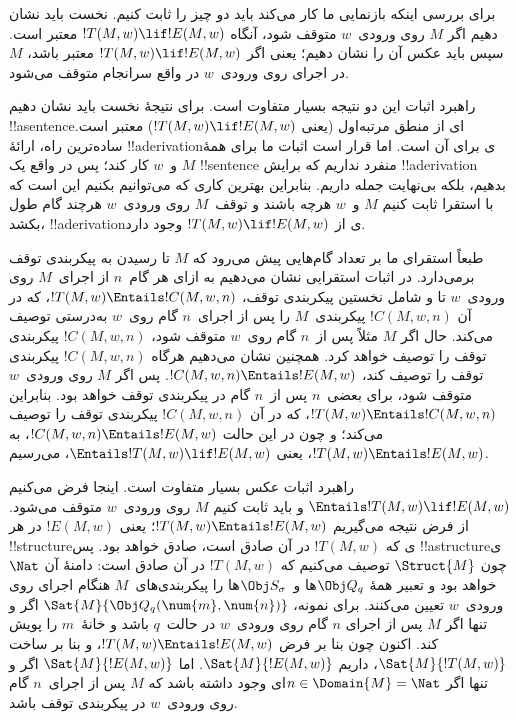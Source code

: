 \documentclass[../../../include/open-logic-section]{subfiles}
\begin{document}

\begin{explain}
برای بررسی اینکه بازنمایی ما کار می‌کند باید دو چیز را ثابت کنیم.
نخست باید نشان دهیم اگر $M$ روی ورودی~$w$ متوقف شود، آنگاه
$!T(M,w)\lif !E(M,w)$ معتبر است. سپس باید عکس آن را نشان دهیم؛ یعنی
اگر $!T(M,w)\lif !E(M,w)$ معتبر باشد، $M$ در اجرای روی ورودی~$w$ در
واقع سرانجام متوقف می‌شود.

راهبرد اثبات این دو نتیجه بسیار متفاوت است. برای نتیجهٔ نخست باید
نشان دهیم !!a{sentence}ای از منطق مرتبه‌اول (یعنی
$!T(M,w)\lif !E(M,w)$) معتبر است. ساده‌ترین راه، ارائهٔ !!a{derivation}ی
برای آن است. اما قرار است اثبات ما برای همهٔ $M$ و~$w$ کار کند؛ پس
در واقع یک !!{sentence}ٔ منفرد نداریم که برایش !!a{derivation} بدهیم، بلکه
بی‌نهایت جمله داریم. بنابراین بهترین کاری که می‌توانیم بکنیم این است
که با استقرا ثابت کنیم $M$ و~$w$ هرچه باشند و توقف~$M$ روی ورودی~$w$
هرچند گام طول بکشد، !!a{derivation}ی از $!T(M,w)\lif !E(M,w)$ وجود دارد.

طبعاً استقرای ما بر تعداد گام‌هایی پیش می‌رود که $M$ تا رسیدن به
پیکربندی توقف برمی‌دارد. در اثبات استقرایی نشان می‌دهیم به ازای هر
گام~$n$ از اجرای~$M$ روی ورودی~$w$ تا و شامل نخستین پیکربندی توقف،
$!T(M,w)\Entails !C(M,w,n)$، که در آن $!C(M,w,n)$ پیکربندی~$M$ را پس
از اجرای~$n$ گام روی~$w$ به‌درستی توصیف می‌کند. حال اگر $M$ مثلاً پس
از~$n$ گام روی~$w$ متوقف شود، $!C(M,w,n)$ پیکربندی توقف را توصیف
خواهد کرد. همچنین نشان می‌دهیم هرگاه $!C(M,w,n)$ پیکربندی توقف را
توصیف کند، $!C(M,w,n)\Entails !E(M,w)$. پس اگر $M$ روی ورودی~$w$
متوقف شود، برای بعضی~$n$ پس از~$n$ گام در پیکربندی توقف خواهد بود.
بنابراین $!T(M,w)\Entails !C(M,w,n)$، که در آن $!C(M,w,n)$ پیکربندی
توقف را توصیف می‌کند؛ و چون در این حالت
$!C(M,w,n)\Entails !E(M,w)$، به
$!T(M,w)\Entails !E(M,w)$، یعنی
$\Entails !T(M,w)\lif !E(M,w)$، می‌رسیم.

راهبرد اثبات عکس بسیار متفاوت است. اینجا فرض می‌کنیم
$\Entails !T(M,w)\lif !E(M,w)$ و باید ثابت کنیم $M$ روی ورودی~$w$
متوقف می‌شود. از فرض نتیجه می‌گیریم
$!T(M,w)\Entails !E(M,w)$؛ یعنی $!E(M,w)$ در هر !!{structure}ی که
$!T(M,w)$ در آن صادق است، صادق خواهد بود. پس !!a{structure}ی چون
$\Struct{M}$ توصیف می‌کنیم که $!T(M,w)$ در آن صادق است: دامنهٔ آن
$\Nat$ خواهد بود و تعبیر همهٔ $\Obj Q_q$ها و~$\Obj S_\sigma$ها را
پیکربندی‌های~$M$ هنگام اجرای روی ورودی~$w$ تعیین می‌کنند. برای نمونه،
$\Sat{M}{\Obj Q_q(\num{m},\num{n})}$ اگر و تنها اگر $M$ پس از اجرای
$n$ گام روی ورودی~$w$ در حالت~$q$ باشد و خانهٔ~$m$ را پویش کند. اکنون
چون بنا بر فرض $!T(M,w)\Entails !E(M,w)$، و بنا بر ساخت
$\Sat{M}{!T(M,w)}$، داریم $\Sat{M}{!E(M,w)}$. اما
$\Sat{M}{!E(M,w)}$ اگر و تنها اگر $n\in\Domain{M}=\Nat$ای وجود داشته
باشد که $M$ پس از اجرای~$n$ گام روی ورودی~$w$ در پیکربندی توقف باشد.
\end{explain}
\end{document}
